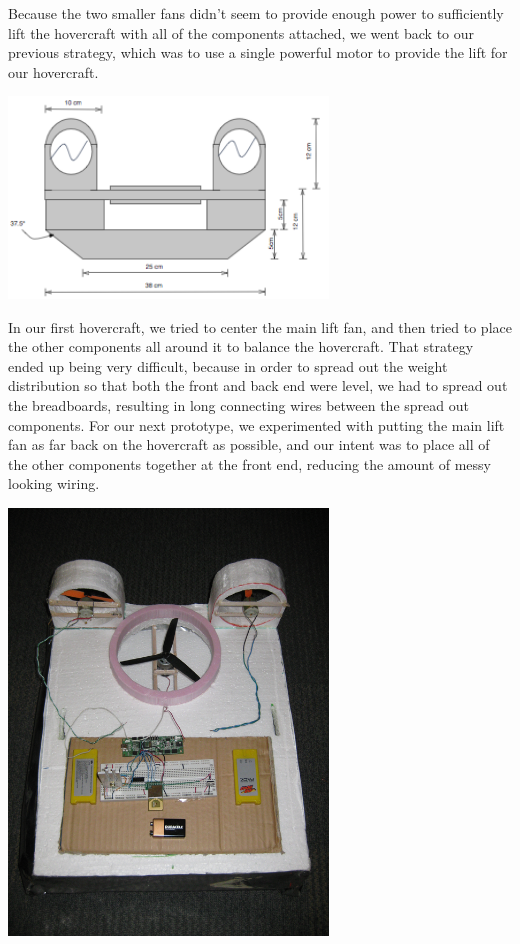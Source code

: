 Because the two smaller fans didn't seem to provide enough power to sufficiently lift the hovercraft with all of the components
attached, we went back to our previous strategy, which was to use a single powerful motor to provide the lift for our hovercraft. 

\begin{center}
  \includegraphics[width=85mm]{imageSources/Frontfinal.png}
\end{center}
\label{finaltop}

In our first hovercraft, we tried to center the main lift fan, and then tried to place the other components all around it to 
balance the hovercraft. That strategy ended up being very difficult, because in order to spread out the weight distribution so that
both the front and back end were level, we had to spread out the breadboards, resulting in long connecting wires between the spread
out components. For our next prototype, we experimented with putting the main lift fan as far back on the hovercraft as possible,
and our intent was to place all of the other components together at the front end, reducing the amount of messy looking
wiring. 

\begin{center}
  \includegraphics[width=85mm]{imageSources/designProblemsnew_weight.png}
\end{center}
\label{new_weight}

